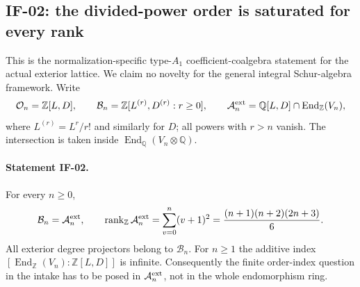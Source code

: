 \documentclass[11pt,a4paper]{article}
\theoremstyle{definition}
\theoremstyle{remark}
\begin{document}
\subsection{IF-02: the divided-power order is saturated for every rank}
This is the normalization-specific type-$A_1$ coefficient-coalgebra
statement for the actual exterior lattice. We claim no novelty for
the general integral Schur-algebra framework.
Write
\[
 \mathcal O_n=\mathbb Z[L,D],\qquad
 \mathcal B_n=\mathbb Z[L^{(r)},D^{(r)}:r\geq0],\qquad
 \mathcal A_n^{\rm ext}=\mathbb Q[L,D]\cap\operatorname{End}_{\mathbb Z}(V_n),
\]
where $L^{(r)}=L^r/r!$ and similarly for $D$; all powers with $r>n$
vanish. The intersection is taken inside
$\operatorname{End}_{\mathbb Q}(V_n\otimes\mathbb Q)$.

\paragraph{Statement IF-02.}
For every $n\geq0$,
\[
 \mathcal B_n=\mathcal A_n^{\rm ext},\qquad
 \operatorname{rank}_{\mathbb Z}\mathcal A_n^{\rm ext}
 =\sum_{v=0}^n(v+1)^2=\frac{(n+1)(n+2)(2n+3)}6.
\]
All exterior degree projectors belong to $\mathcal B_n$. For $n\geq1$
the additive index
$[\operatorname{End}_{\mathbb Z}(V_n):\mathbb Z[L,D]]$ is infinite.
Consequently the finite order-index question in the intake has to be
posed in $\mathcal A_n^{\rm ext}$, not in the whole endomorphism ring.
\end{document}
